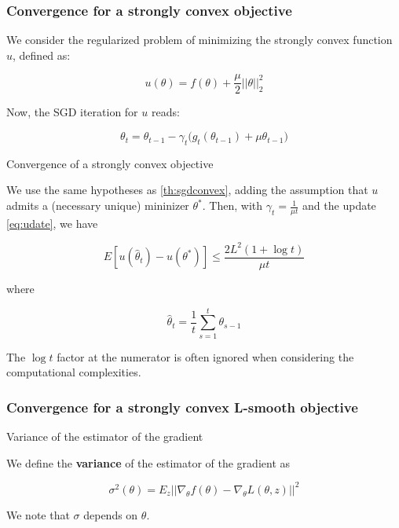 \documentclass[
10pt, %
a4paper, %
oneside, %
headinclude,footinclude, %
BCOR5mm, %
]{scrartcl}
\begin{document}
\subsubsection{\large\color{Periwinkle}Convergence for a strongly convex objective}
\label{ssub:sgd_strongly_convex}


We consider the regularized problem of minimizing the strongly convex function $u$, defined as:

\begin{equation*}
    u(\theta) = f(\theta)+ \frac{\mu}{2} ||\theta||_2^2
\end{equation*}

Now, the SGD iteration for $u$ reads:

\begin{equation}
    \label{eq:udate}
    \theta_t = \theta_{t-1}- \gamma_t\big(g_t(\theta_{t-1})+\mu \theta_{t-1}\big)
\end{equation}

\begin{theorem}{Convergence of a strongly convex objective}

    We use the same hypotheses as \ref{th:sgdconvex}, adding the assumption
    that $u$ admits a (necessary unique) mininizer $\theta^*$. Then, with
    $\gamma_t =  \frac{1}{\mu t} $ and the update \ref{eq:udate}, we have

    \begin{equation}
	E[u( \hat{\theta}_t)-u(\theta^*)]\leq \frac{2L^2 (1+\log t)}{\mu t} 
    \end{equation}

    where 

    \begin{equation}
	\hat{\theta}_t = \frac{1}{t} \sum^{t}_{s=1} \theta_{s-1}
    \end{equation}

\end{theorem}

\begin{remark}
    The $\log t$ factor at the numerator is often ignored when considering the computational complexities.
\end{remark}

\subsubsection{\large\color{Periwinkle}Convergence for a strongly convex L-smooth objective}

\begin{definition}{Variance of the estimator of the gradient}

    We define the \textbf{{variance}} of the estimator of the gradient as

    \begin{equation}
	\sigma^2(\theta) = E_{z}|| \nabla_{\theta} f(\theta)- \nabla_{\theta}L(\theta, z)||^2
    \end{equation}

    We note that $\sigma $ depends on $ \theta$.
    
\end{definition}
\end{document}

